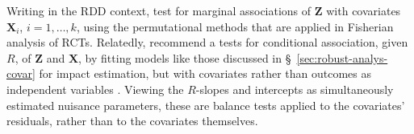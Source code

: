 
 Writing in the RDD context, \citet{cattaneo2014randomization} test
 for marginal associations of $\mathbf{Z}$ with covariates $\mathbf{X}_{i}$,
 $i=1, \ldots, k$, using the permutational methods that are applied
 in Fisherian analysis of RCTs.
Relatedly, \citet{lee2010regression} recommend a
 tests for conditional association, given $R$, of $\mathbf{Z}$ and
 $\mathbf{X}$, by fitting models like those discussed in
 \S~\ref{sec:robust-analys-covar} for impact estimation, but with
 covariates rather than outcomes as independent variables%
. %
Viewing the $R$-slopes and intercepts as simultaneously estimated
 nuisance parameters, these are balance tests applied to
 the covariates' residuals, %
rather than to the covariates themselves.

